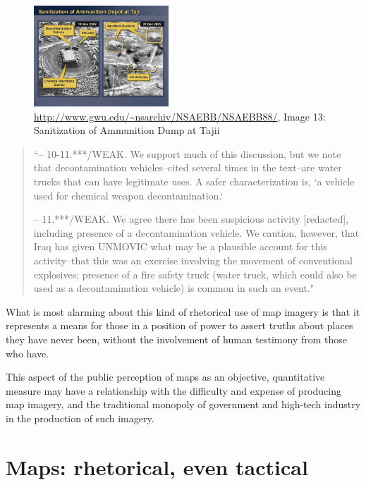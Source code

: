 \documentclass[11pt]{report}
\begin{document}
\begin{figure}
	\begin{flushright}
		\includegraphics[width=0.45\textwidth]{images/iraq-image-13.jpg}
		\url{http://www.gwu.edu/~nsarchiv/NSAEBB/NSAEBB88/}, Image 13: Sanitization of Ammunition Dump at Tajii	
	\end{flushright}
\end{figure}

\begin{quote}
	``-- 10-11.***/WEAK. We support much of this discussion, but we note that decontamination vehicles--cited several times in the text--are water trucks that can have legitimate uses. A safer characterization is, `a vehicle used for chemical weapon decontamination.`

-- 11.***/WEAK. We agree there has been suspicious activity [redacted], including presence of a decontamination vehicle. We caution, however, that Iraq has given UNMOVIC what may be a plausible account for this activity--that this was an exercise involving the movement of conventional explosives; presence of a fire safety truck (water truck, which could also be used as a decontamination vehicle) is common in such an event."
	\cite{senate2004report}
\end{quote} 


What is most alarming about this kind of rhetorical use of map imagery is that it represents a means for those in a position of power to assert truths about places they have never been, without the involvement of human testimony from those who have.

This aspect of the public perception of maps as an objective, quantitative measure may have a relationship with the difficulty and expense of producing map imagery, and the traditional monopoly of government and high-tech industry in the production of such imagery.

\section{Maps: rhetorical, even tactical}
\end{document}
